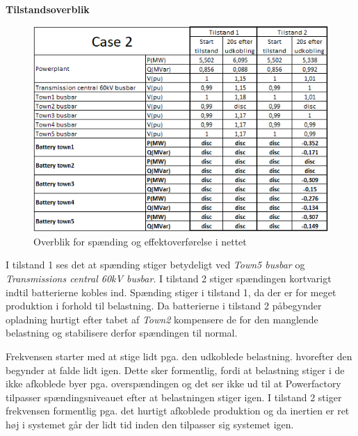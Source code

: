 \newpage
\textbf{Tilstandsoverblik}
\begin{figure}[H] %
	\centering
	\includegraphics[width=1\textwidth]{figurer/LossOfTown/Overview}
	\caption{Overblik for spænding og effektoverførelse i nettet}
	\label{fig:C2Overview}
\end{figure}

I tilstand 1 ses det at spænding stiger betydeligt ved \textit{Town5 busbar} og \textit{Transmissions central 60kV busbar}. I tilstand 2 stiger spændingen kortvarigt indtil batterierne kobles ind. Spænding stiger i tilstand 1, da der er for meget produktion i forhold til belastning. Da batterierne i tilstand 2 påbegynder opladning hurtigt efter tabet af \textit{Town2} kompensere de for den manglende belastning og stabilisere derfor spændingen til normal.

Frekvensen starter med at stige lidt pga. den udkoblede belastning. hvorefter den begynder at falde lidt igen. Dette sker formentlig, fordi at belastning stiger i de ikke afkoblede byer pga. overspændingen og det ser ikke ud til at Powerfactory tilpasser spændingsniveauet efter at belastningen stiger igen. I tilstand 2 stiger frekvensen formentlig pga. det hurtigt afkoblede produktion og da inertien er ret høj i systemet går der lidt tid inden den tilpasser sig systemet igen.
  
